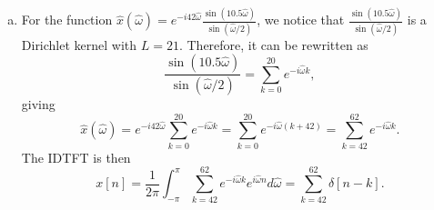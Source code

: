 \begin{enumerate}
\begin{enumerate}[a)]
\item For the function $\hat{x}(\hat{\omega})=e^{-i42\hat{\omega}}\frac{\sin(10.5\hat{\omega})}{\sin(\hat{\omega}/2)}$, we notice that $\frac{\sin(10.5\hat{\omega})}{\sin(\hat{\omega}/2)}$ is a Dirichlet kernel with $L=21$. Therefore, it can be rewritten as
$$\frac{\sin(10.5\hat{\omega})}{\sin(\hat{\omega}/2)}=\sum_{k=0}^{20}e^{-i\hat{\omega}k},$$
giving
$$\hat{x}(\hat{\omega})=e^{-i42\hat{\omega}}\sum_{k=0}^{20}e^{-i\hat{\omega}k}=\sum_{k=0}^{20}e^{-i\hat{\omega}(k+42)}=\sum_{k=42}^{62}e^{-i\hat{\omega}k}.$$
The IDTFT is then
$$x[n]=\frac{1}{2\pi}\int_{-\pi}^{\pi}\sum_{k=42}^{62}e^{-i\hat{\omega}k}e^{i\hat{\omega}n}d\hat{\omega} =\sum_{k=42}^{62}\delta[n-k].$$
\end{enumerate}









\end{enumerate}